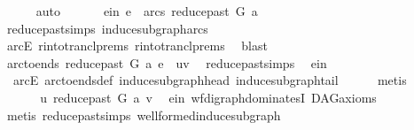 \begin{isabellebody}
\ \ \ \ \isamarkupfalse%
\ auto\ \isanewline
\ \ \isamarkupfalse%
\ \isamarkupfalse%
\ e{\isacharunderscore}{\kern0pt}in{}{\isacharcolon}{\kern0pt}\ {\isachardoublequoteopen}e\ {\isasymin}\ arcs\ {\isacharparenleft}{\kern0pt}reduce{\isacharunderscore}{\kern0pt}past\ G\ a{\isacharparenright}{\kern0pt}{\isachardoublequoteclose}\ \isamarkupfalse%
\ reduce{\isacharunderscore}{\kern0pt}past{\isachardot}{\kern0pt}simps\ induce{\isacharunderscore}{\kern0pt}subgraph{\isacharunderscore}{\kern0pt}arcs\isanewline
\ \ \ \ \isamarkupfalse%
\ arcE\ r{\isacharunderscore}{\kern0pt}into{\isacharunderscore}{\kern0pt}trancl{\isachardot}{\kern0pt}prems{\isacharparenleft}{\kern0pt}{}{\isacharparenright}{\kern0pt}\ r{\isacharunderscore}{\kern0pt}into{\isacharunderscore}{\kern0pt}trancl{\isachardot}{\kern0pt}prems{\isacharparenleft}{\kern0pt}{}{\isacharparenright}{\kern0pt}\ \isamarkupfalse%
\ blast\isanewline
\ \ \isamarkupfalse%
\ \isamarkupfalse%
\ {\isachardoublequoteopen}arc{\isacharunderscore}{\kern0pt}to{\isacharunderscore}{\kern0pt}ends\ {\isacharparenleft}{\kern0pt}reduce{\isacharunderscore}{\kern0pt}past\ G\ a{\isacharparenright}{\kern0pt}\ e\ {\isacharequal}{\kern0pt}\ {\isacharparenleft}{\kern0pt}u{\isacharcomma}{\kern0pt}v{\isacharparenright}{\kern0pt}{\isachardoublequoteclose}\ \isamarkupfalse%
\ reduce{\isacharunderscore}{\kern0pt}past{\isachardot}{\kern0pt}simps\ \isamarkupfalse%
\ e{\isacharunderscore}{\kern0pt}in\isanewline
\ \ arcE\ arc{\isacharunderscore}{\kern0pt}to{\isacharunderscore}{\kern0pt}ends{\isacharunderscore}{\kern0pt}def\ induce{\isacharunderscore}{\kern0pt}subgraph{\isacharunderscore}{\kern0pt}head\ induce{\isacharunderscore}{\kern0pt}subgraph{\isacharunderscore}{\kern0pt}tail\isanewline
\ \ \ \ \isamarkupfalse%
\ metis\ \ \isanewline
\ \ \isanewline
\ \ \isamarkupfalse%
\ \isamarkupfalse%
\ \ {\isachardoublequoteopen}u\ {\isasymrightarrow}\isactrlbsub reduce{\isacharunderscore}{\kern0pt}past\ G\ a\isactrlesub \ v{\isachardoublequoteclose}\ \isamarkupfalse%
\ e{\isacharunderscore}{\kern0pt}in{}\ wf{\isacharunderscore}{\kern0pt}digraph{\isachardot}{\kern0pt}dominatesI\ DAG{\isacharunderscore}{\kern0pt}axioms\isanewline
\ \ \ \ \isamarkupfalse%
\ {\isacharparenleft}{\kern0pt}metis\ reduce{\isacharunderscore}{\kern0pt}past{\isachardot}{\kern0pt}simps\ wellformed{\isacharunderscore}{\kern0pt}induce{\isacharunderscore}{\kern0pt}subgraph{\isacharparenright}{\kern0pt}\ \ \isanewline

\end{isabellebody}
